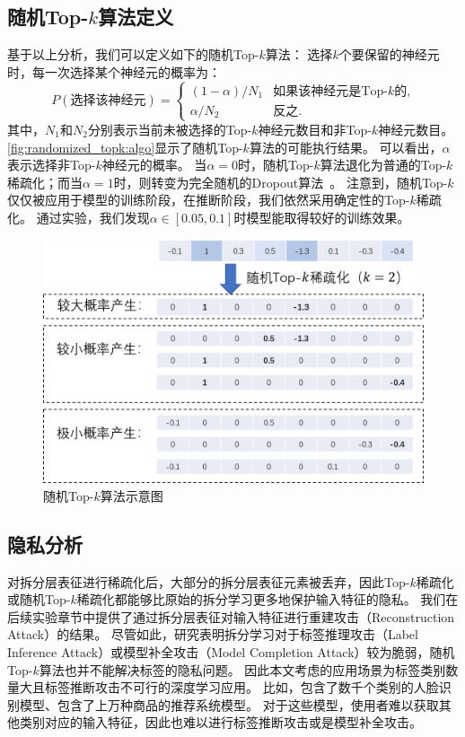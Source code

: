 \subsection{随机Top-$k$算法定义}
基于以上分析，我们可以定义如下的随机Top-$k$算法：
%
选择$k$个要保留的神经元时，每一次选择某个神经元的概率为：
\begin{equation}
\label{eq:randomized_topk:def}
    P(\text{选择该神经元}) = 
    \begin{cases}
        (1 - \alpha) / N_1  & \text{如果该神经元是Top-$k$的,} \\
        \alpha / N_2        & \text{反之.}    
    \end{cases}
\end{equation}
%
其中，$N_1$和$N_2$分别表示当前未被选择的Top-$k$神经元数目和非Top-$k$神经元数目。
%
\autoref{fig:randomized_topk:algo}显示了随机Top-$k$算法的可能执行结果。
%
可以看出，$\alpha$表示选择非Top-$k$神经元的概率。
%
当$\alpha=0$时，随机Top-$k$算法退化为普通的Top-$k$稀疏化；而当$\alpha=1$时，则转变为完全随机的Dropout算法~\cite{srivastava_2014_dropout}。
%
注意到，随机Top-$k$仅仅被应用于模型的训练阶段，在推断阶段，我们依然采用确定性的Top-$k$稀疏化。
%
通过实验，我们发现$\alpha \in [0.05, 0.1]$时模型能取得较好的训练效果。
%
\begin{figure}[h!]
    \centering
    \includegraphics[width=0.7\linewidth]{Z_Resources/randtopk_algorithm.png}
    \caption{随机Top-$k$算法示意图}
    \label{fig:randomized_topk:algo}
\end{figure}


\subsection{隐私分析}
对拆分层表征进行稀疏化后，大部分的拆分层表征元素被丢弃，因此Top-$k$稀疏化或随机Top-$k$稀疏化都能够比原始的拆分学习更多地保护输入特征的隐私。
%
我们在后续实验章节中提供了通过拆分层表征对输入特征进行重建攻击（Reconstruction Attack）的结果。
%
尽管如此，研究表明拆分学习对于标签推理攻击（Label Inference Attack）或模型补全攻击（Model Completion Attack）较为脆弱\cite{fucong2022label_infer_attack}，随机Top-$k$算法也并不能解决标签的隐私问题。
%
因此本文考虑的应用场景为标签类别数量大且标签推断攻击不可行的深度学习应用。
%
比如，包含了数千个类别的人脸识别模型、包含了上万种商品的推荐系统模型。
%
对于这些模型，使用者难以获取其他类别对应的输入特征，因此也难以进行标签推断攻击或是模型补全攻击。
%

